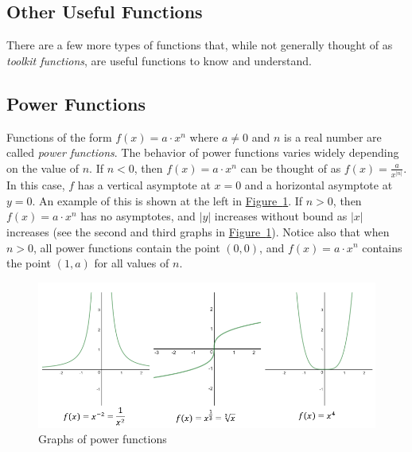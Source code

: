 \documentclass[10pt,]{book}
\theoremstyle{ptxdefinitionnotitle}
\theoremstyle{ptxdefinitiontitle}
\numberwithin{equation}{section}
\newcommand{\lt}{<}
\newcommand{\gt}{>}
\begin{document}
\subsection[{Other Useful Functions}]{Other Useful Functions}\label{subsection-10}
\hypertarget{p-56}{}%
There are a few more types of functions that, while not generally thought of as \emph{toolkit functions}, are useful functions to know and understand.%
\typeout{************************************************}
\typeout{************************************************}
\subsection[{Power Functions}]{Power Functions}\label{subsection-11}
\hypertarget{p-57}{}%
Functions of the form \(f(x) = a \cdot x^n\) where \(a \neq 0\) and \(n\) is a real number are called \emph{power functions}. The behavior of power functions varies widely depending on the value of \(n\).  If \(n \lt 0\), then \(f(x) = a \cdot x^n\) can be thought of as \(f(x) = \frac{a}{x^{\lvert n \rvert}}\).  In this case, \(f\) has a vertical asymptote at \(x = 0\) and a horizontal asymptote at \(y = 0\). An example of this is shown at the left in \hyperref[chapter02-section02-power]{Figure~\ref{chapter02-section02-power}}.  If \(n \gt 0\), then \(f(x) = a \cdot x^n\) has no asymptotes, and \(\lvert y \rvert\) increases without bound as \(\lvert x \rvert\) increases (see the second and third graphs in \hyperref[chapter02-section02-power]{Figure~\ref{chapter02-section02-power}}).  Notice also that when \(n \gt 0\), all power functions contain the point \(\left( 0, 0 \right)\), and \(f(x) = a \cdot x^n\) contains the point \(\left( 1, a \right)\) for all values of \(n\).%
\begin{figure}
\centering
\includegraphics[width=1\linewidth]{./src/images/chapter02/chapter02section02-power.png}
\caption{Graphs of power functions\label{chapter02-section02-power}}
\end{figure}
\typeout{************************************************}
\typeout{************************************************}
\end{document}
